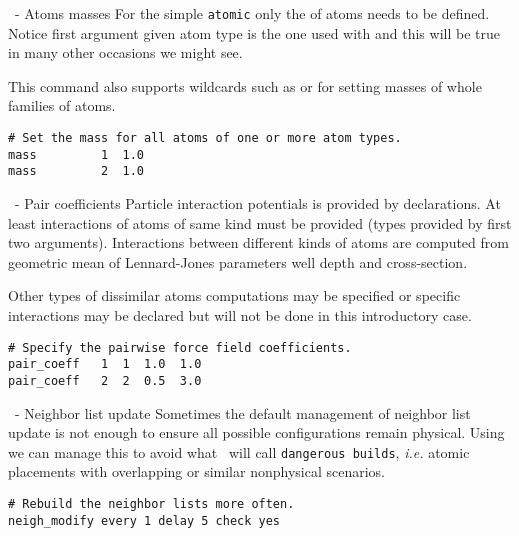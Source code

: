 \begin{frame}[fragile]{\secname}{\subsecname\ - Atoms masses}
For the simple \Verb|atomic|  only the  of atoms needs to be defined. Notice first argument given atom type is the one used with  and this will be true in many other occasions we might see.

\vspace{0.5cm}

This command also supports wildcards such as  or  for setting masses of whole families of atoms.

\vspace{0.5cm}

\begin{lstlisting}[language=LAMMPS]
# Set the mass for all atoms of one or more atom types.
mass         1  1.0
mass         2  1.0
\end{lstlisting}
\end{frame}

\begin{frame}[fragile]{\secname}{\subsecname\ - Pair coefficients}
Particle interaction potentials is provided by  declarations. At least interactions of atoms of same kind must be provided (types provided by first two arguments). Interactions between different kinds of atoms are computed from geometric mean of Lennard-Jones parameters well depth and cross-section.

\vspace{0.5cm}

Other types of dissimilar atoms computations may be specified or specific interactions may be declared but will not be done in this introductory case.

\vspace{0.5cm}

\begin{lstlisting}[language=LAMMPS]
# Specify the pairwise force field coefficients.
pair_coeff   1  1  1.0  1.0
pair_coeff   2  2  0.5  3.0
\end{lstlisting}
\end{frame}

\begin{frame}[fragile]{\secname}{\subsecname\ - Neighbor list update}
Sometimes the default management of neighbor list update is not enough to ensure all possible configurations remain physical. Using  we can manage this to avoid what \LAMMPS\ will call \Verb|dangerous builds|, \emph{i.e.} atomic placements with overlapping or similar nonphysical scenarios.

\vspace{0.5cm}

\begin{lstlisting}[language=LAMMPS]
# Rebuild the neighbor lists more often.
neigh_modify every 1 delay 5 check yes
\end{lstlisting}
\end{frame}

